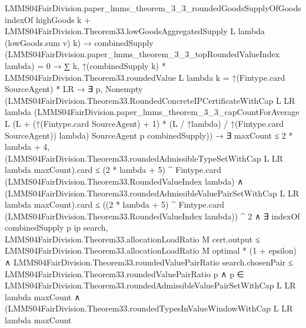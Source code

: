 \documentclass[10pt]{article}
\begin{document}
\begin{ReviewVerbatim}
                                LMMS04FairDivision.paper_lmms_theorem_3_3_roundedGoodsSupplyOfGoods indexOf highGoods
                                    k +
                                  LMMS04FairDivision.Theorem33.lowGoodsAggregatedSupply L lambda (lowGoods.sum v) k) →
                            combinedSupply (LMMS04FairDivision.paper_lmms_theorem_3_3_topRoundedValueIndex lambda) = 0 →
                              ∑ k, ↑(combinedSupply k) * LMMS04FairDivision.Theorem33.roundedValue L lambda k =
                                  ↑(Fintype.card SourceAgent) * LR →
                                ∃ p,
                                  Nonempty
                                    (LMMS04FairDivision.Theorem33.RoundedConcreteIPCertificateWithCap L LR lambda
                                      (LMMS04FairDivision.paper_lmms_theorem_3_3_capCountForAverage L
                                        (L +
                                          (↑(Fintype.card SourceAgent) + 1) * (L / ↑lambda) /
                                            ↑(Fintype.card SourceAgent))
                                        lambda)
                                      SourceAgent p combinedSupply)) →
                      ∃ maxCount ≤ 2 * lambda + 4,
                        (LMMS04FairDivision.Theorem33.roundedAdmissibleTypeSetWithCap L LR lambda maxCount).card ≤
                            (2 * lambda + 5) ^ Fintype.card (LMMS04FairDivision.Theorem33.RoundedValueIndex lambda) ∧
                          (LMMS04FairDivision.Theorem33.roundedAdmissibleValuePairSetWithCap L LR lambda
                                  maxCount).card ≤
                              ((2 * lambda + 5) ^
                                  Fintype.card (LMMS04FairDivision.Theorem33.RoundedValueIndex lambda)) ^
                                2 ∧
                            ∃ indexOf combinedSupply p ip search,
                              LMMS04FairDivision.Theorem33.allocationLoadRatio M cert.output ≤
                                  LMMS04FairDivision.Theorem33.allocationLoadRatio M optimal * (1 + epsilon) ∧
                                LMMS04FairDivision.Theorem33.roundedValuePairRatio search.chosenPair ≤
                                    LMMS04FairDivision.Theorem33.roundedValuePairRatio p ∧
                                  p ∈
                                      LMMS04FairDivision.Theorem33.roundedAdmissibleValuePairSetWithCap L LR lambda
                                        maxCount ∧
                                    (LMMS04FairDivision.Theorem33.roundedTypesInValueWindowWithCap L LR lambda maxCount

\end{ReviewVerbatim}
\end{document}
